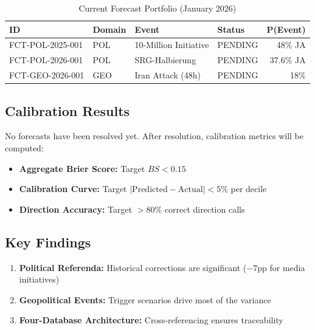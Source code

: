 \begin{table}[h]
\centering
\begin{tabular}{llllr}
\toprule
\textbf{ID} & \textbf{Domain} & \textbf{Event} & \textbf{Status} & \textbf{P(Event)} \\
\midrule
FCT-POL-2025-001 & POL & 10-Million Initiative & PENDING & 48\% JA \\
FCT-POL-2026-001 & POL & SRG-Halbierung & PENDING & 37.6\% JA \\
FCT-GEO-2026-001 & GEO & Iran Attack (48h) & PENDING & 18\% \\
\bottomrule
\end{tabular}
\caption{Current Forecast Portfolio (January 2026)}
\label{tab:forecast-portfolio}
\end{table}

\subsection{Calibration Results}

No forecasts have been resolved yet. After resolution, calibration metrics will be computed:

\begin{itemize}
    \item \textbf{Aggregate Brier Score:} Target $BS < 0.15$
    \item \textbf{Calibration Curve:} Target $|\text{Predicted} - \text{Actual}| < 5\%$ per decile
    \item \textbf{Direction Accuracy:} Target $> 80\%$ correct direction calls
\end{itemize}

\subsection{Key Findings}

\begin{enumerate}
    \item \textbf{Political Referenda:} Historical corrections are significant ($-7$pp for media initiatives)
    \item \textbf{Geopolitical Events:} Trigger scenarios drive most of the variance
    \item \textbf{Four-Database Architecture:} Cross-referencing ensures traceability
\end{enumerate}

